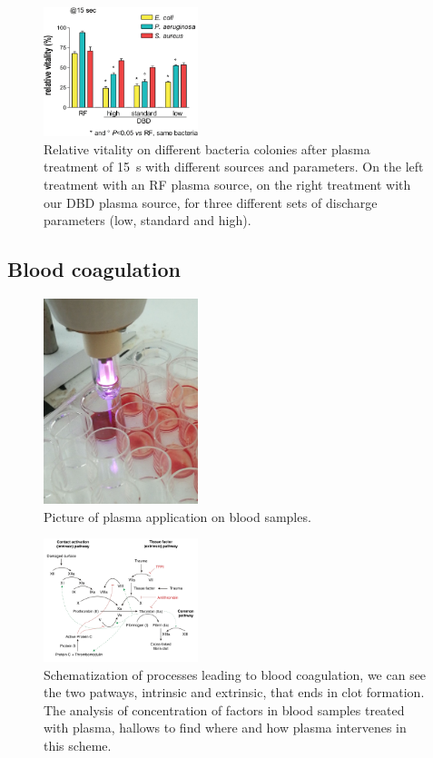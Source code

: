 \begin{figure}
 \centering
 \includegraphics[width=0.4\textwidth]{Images/Intro/bacteria2.png}
 \caption{Relative vitality on different bacteria colonies after plasma treatment of \SI{15}{\second} with different sources and parameters. On the left treatment with an RF plasma source, on the right treatment with our DBD plasma source, for three different sets of discharge parameters (low, standard and high).}
 \label{fig:bact}
\end{figure}

\subsection{Blood coagulation}

\begin{figure}
 \centering
 \includegraphics[width=0.4\textwidth]{Images/Intro/source_application.png}
 \caption{Picture of plasma application on blood samples.}
 \label{fig:plasmaapp}
\end{figure}

\begin{figure}
 \centering
 \includegraphics[width=0.4\textwidth]{Images/Intro/coag_map.png}
 \caption{Schematization of processes leading to blood coagulation, we can see the two patways, intrinsic and extrinsic, that ends in clot formation. The analysis of concentration of factors in blood samples treated with plasma, hallows to find where and how plasma intervenes in this scheme.}
 \label{fig:coag}
\end{figure}


